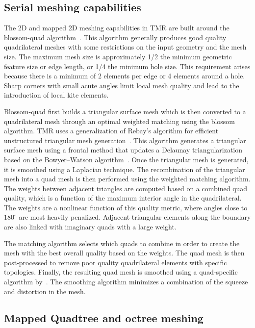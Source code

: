 \documentclass[12pt]{article}
\begin{document}
\subsection{Serial meshing capabilities}

The 2D and mapped 2D meshing capabilities in TMR are built around the blossom-quad algorithm~\citep{Remacle:2012:blossom-quad}.
This algorithm generally produces good quality quadrilateral meshes with some restrictions on the input geometry and the mesh size.
The maximum mesh size is approximately 1/2 the minimum geometric feature size or edge length, or 1/4 the minimum hole size.
This requirement arises because there is a minimum of 2 elements per edge or 4 elements around a hole.
Sharp corners with small acute angles limit local mesh quality and lead to the introduction of local kite elements. 

Blossom-quad first builds a triangular surface mesh which is then converted to a quadrilateral mesh through an optimal weighted matching using the blossom algorithm.
TMR uses a generalization of Rebay's algorithm for efficient unstructured triangular mesh generation~\citep{Rebay:1993:unstructured-triangle}. 
This algorithm generates a triangular surface mesh using a frontal method that updates a Delaunay triangularization based on the Bowyer--Watson algorithm~\citep{Shewchuk:2012:Delaunay-notes}.
Once the triangular mesh is generated, it is smoothed using a Laplacian technique.
The recombination of the triangular mesh into a quad mesh is then performed using the weighted matching algorithm. 
The weights between adjacent triangles are computed based on a combined quad quality, which is a function of the maximum interior angle in the quadrilateral.
The weights are a nonlinear function of this quality metric, where angles close to $180^{\circ}$ are most heavily penalized.
Adjacent triangular elements along the boundary are also linked with imaginary quads with a large weight.

The matching algorithm selects which quads to combine in order to create the mesh with the best overall quality based on the weights. 
The quad mesh is then post-processed to remove poor quality quadrilateral elements with specific topologies.
Finally, the resulting quad mesh is smoothed using a quad-specific algorithm by~\citet{Giuliani:1982:quad-smoothing}. 
The smoothing algorithm minimizes a combination of the squeeze and distortion in the mesh. 

\subsection{Mapped Quadtree and octree meshing}
\end{document}
